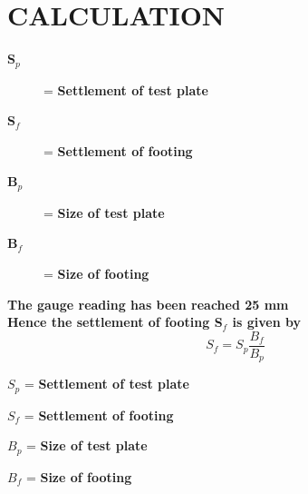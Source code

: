 \documentclass[a4paper,12pt]{article}
\begin{document}
\newpage
\section*{CALCULATION}
\begin{description}
\item[\textbf{S}$_p$] = \textbf{Settlement of test plate}
\item[\textbf{S}$_f$] = \textbf{Settlement of footing} 
\item[\textbf{B}$_p$] = \textbf{Size of test plate} 
\item[\textbf{B}$_f$] = \textbf{Size of footing} 
\end{description}
$$ $$
\textbf{
The gauge reading has been reached 25 mm \\
Hence the settlement of footing \textbf{S}$_f$ is given by}
\textbf{$$ S_f = S_p \frac{B_f}{B_p} $$ }
\item[\textbf{$ S_p$}] = \textbf{Settlement of test plate}
\item[\textbf{$ S_f$}] = \textbf{Settlement of footing} 
\item[\textbf{$ B_p$}] = \textbf{Size of test plate}
\item[\textbf{$ B_f$}] = \textbf{Size of footing }
\end{document}
